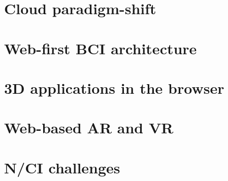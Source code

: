 \section{Cloud paradigm-shift}
\label{chapter2-cloud-paradigm-shift}


\section{Web-first BCI architecture}
\label{chapter2-web-first-bci-architecture}


\section{3D applications in the browser}
\label{chapter2-3d-applications-in-the-browser}


\section{Web-based AR and VR}
\label{chapter2-web-based-ar-and-vr}


\section{N/CI challenges}
\label{chapter2-nci-challenges}


